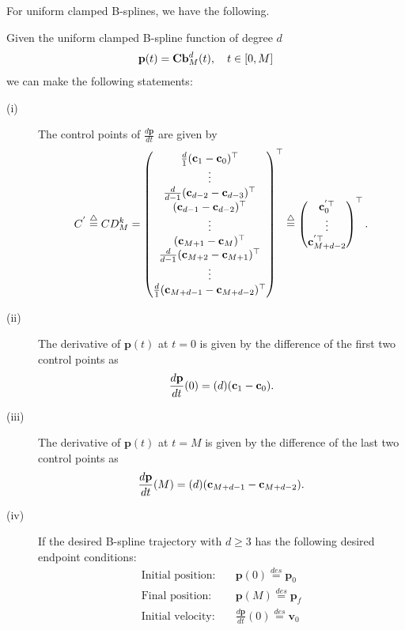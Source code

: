For uniform clamped B-splines, we have the following.

\begin{corollary} \label{cor:derivatives_clamped_splines}
	Given the uniform clamped B-spline function of degree $d$
	\[
	\mathbf{p}(t) = \mathbf{C} \mathbf{b}_M^d(t), \quad t\in[0, M]
	\]
	we can make the following statements:
	\begin{description}
	\item[(i)] The control points of $\frac{d\mathbf{p}}{dt}$ are given by
		\[
		C^{'} \stackrel{\triangle}{=} C D_M^k = \begin{pmatrix}
				\frac{d}{1} (\mathbf{c}_1 - \mathbf{c}_0)^\top \\
				\vdots \\
				\frac{d}{d-1} (\mathbf{c}_{d-2} - \mathbf{c}_{d-3})^\top \\
				(\mathbf{c}_{d-1} - \mathbf{c}_{d-2})^\top \\
				\vdots \\
				(\mathbf{c}_{M+1} - \mathbf{c}_{M})^\top \\
				\frac{d}{d-1} (\mathbf{c}_{M+2}-\mathbf{c}_{M+1})^\top \\
				\vdots \\
				\frac{d}{1} (\mathbf{c}_{M+d-1} - \mathbf{c}_{M+d-2})^\top
 				\end{pmatrix}^\top
 			\stackrel{\triangle}{=} \begin{pmatrix}
 			        \mathbf{c}_0^{'\top} \\
 			        \vdots \\
 			        \mathbf{c}_{M+d-2}^{'\top}
 				   \end{pmatrix}^\top.
		\]
	\item[(ii)] The derivative of $\mathbf{p}(t)$ at $t=0$ is given by the difference of the first two control points as
		\[
			\frac{d\mathbf{p}}{dt}(0) = (d)(\mathbf{c}_1 - \mathbf{c}_0).
		\]
	\item[(iii)] The derivative of $\mathbf{p}(t)$ at $t=M$ is given by the difference of the last two control points as
		\[
			\frac{d\mathbf{p}}{dt}(M) = (d)(\mathbf{c}_{M+d-1} - \mathbf{c}_{M+d-2}).
		\]
	\item[(iv)] If the desired B-spline trajectory with $d\geq 3$ has the following desired endpoint conditions:
		\begin{align*}
			\text{Initial position:} &\quad \mathbf{p}(0) \stackrel{des}{=} \mathbf{p}_0 \\	
			\text{Final position:} &\quad \mathbf{p}(M) \stackrel{des}{=} \mathbf{p}_f \\
			\text{Initial velocity:} &\quad \frac{d\mathbf{p}}{dt}(0) \stackrel{des}{=} \mathbf{v}_0 \\	

\end{align*}
\end{description}
\end{corollary}
